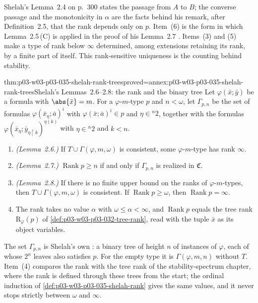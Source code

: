Shelah's Lemma~2.4 on p.~300 states the passage from \(A\) to \(B\); the
converse passage and the monotonicity in \(\alpha\) are the facts behind his
remark, after Definition~2.5, that the rank depends only on \(p\).  Item~(6)
is the form in which Lemma~2.5\,(C) is applied in the proof of his
Lemma~2.7 \cite[p.~302]{Shelah1971Stability}.  Items~(3) and (5) make a type
of rank below \(\infty\) determined, among extensions retaining its rank,
by a finite part of itself.  This rank-sensitive uniqueness is the counting
behind stability.

\begin{hblemma}{thm:p03-w03-p03-035-shelah-rank-trees}{proved=annex:p03-w03-p03-035-shelah-rank-trees}{Shelah's Lemmas~2.6--2.8: the rank and the binary tree}
Let \(\varphi(\bar x;\bar y)\) be a formula with \(\abs{\bar x}=m\).  For a
\(\varphi\)-\(m\)-type \(p\) and \(n<\omega\), let \(\Gamma_{p,n}\) be the set
of formulas \(\varphi(\bar x_\eta;\bar a)^{i}\) with
\(\varphi(\bar x;\bar a)^{i}\in p\) and \(\eta\in{}^{n}2\), together with
the formulas \(\varphi(\bar x_\eta;\bar y_{\eta\restriction k})^{\eta(k)}\)
with \(\eta\in{}^{n}2\) and \(k<n\).
\begin{enumerate}
  \item \emph{(Lemma~2.6.)}  If \(T\cup\Gamma(\varphi,m,\omega)\) is
        consistent, some \(\varphi\)-\(m\)-type has rank \(\infty\).
  \item \emph{(Lemma~2.7.)}  \(\operatorname{Rank}p\geq n\) if and only if
        \(\Gamma_{p,n}\) is realized in \(\mathfrak C\).
  \item \emph{(Lemma~2.8.)}  If there is no finite upper bound on the ranks
        of \(\varphi\)-\(m\)-types, then \(T\cup\Gamma(\varphi,m,\omega)\)
        is consistent.  If \(\operatorname{Rank}p\geq\omega\), then
        \(\operatorname{Rank}p=\infty\).
  \item The rank takes no value \(\alpha\) with
        \(\omega\leq\alpha<\infty\), and \(\operatorname{Rank}p\) equals the
        tree rank \(\mathrm R_\varphi(p)\) of
        \cref{def:p03-w03-p03-032-tree-rank}, read with the tuple \(\bar x\)
        as its object variables.
\end{enumerate}
\end{hblemma}

The set \(\Gamma_{p,n}\) is Shelah's own \cite[Lemma~2.7,
p.~301]{Shelah1971Stability}: a binary tree of height \(n\) of instances of
\(\varphi\), each of whose \(2^n\) leaves also satisfies \(p\).  For the
empty type it is \(\Gamma(\varphi,m,n)\) without \(T\).  Item~(4) compares
the rank with the tree rank of the stability-spectrum chapter, where the
rank is defined through these trees from the start; the ordinal induction of
\cref{def:p03-w03-p03-035-shelah-rank} gives the same values, and it never
stops strictly between \(\omega\) and \(\infty\).

